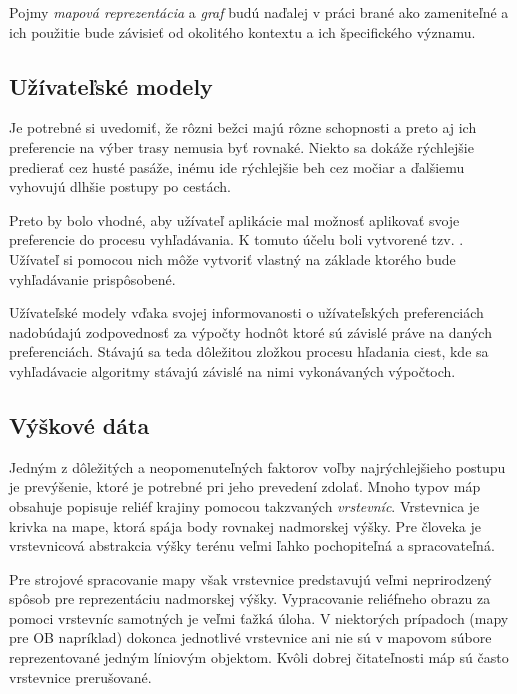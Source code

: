 Pojmy \textit{mapová reprezentácia} a \textit{graf} budú naďalej v práci brané ako zameniteľné a ich použitie bude závisieť od okolitého kontextu a ich špecifického významu.

\subsection{Užívateľské modely}

Je potrebné si uvedomiť, že rôzni bežci majú rôzne schopnosti a preto aj ich preferencie na výber trasy nemusia byť rovnaké. Niekto sa dokáže rýchlejšie predierať cez husté pasáže, inému ide rýchlejšie beh cez močiar a ďalšiemu vyhovujú dlhšie postupy po cestách. 

Preto by bolo vhodné, aby užívateľ aplikácie mal možnosť aplikovať svoje preferencie do procesu vyhľadávania. K tomuto účelu boli vytvorené tzv. . Užívateľ si pomocou nich môže vytvoriť vlastný  na základe ktorého bude vyhľadávanie prispôsobené.

Užívateľské modely vďaka svojej informovanosti o užívateľských preferenciách nadobúdajú zodpovednosť za výpočty hodnôt ktoré sú závislé práve na daných preferenciách. Stávajú sa teda dôležitou zložkou procesu hľadania ciest, kde sa vyhľadávacie algoritmy stávajú závislé na nimi vykonávaných výpočtoch.

\subsection{Výškové dáta}

Jedným z dôležitých a neopomenuteľných faktorov voľby najrýchlejšieho postupu je prevýšenie, ktoré je potrebné pri jeho prevedení zdolať. Mnoho typov máp obsahuje popisuje reliéf krajiny pomocou takzvaných \textit{vrstevníc}. Vrstevnica je krivka na mape, ktorá spája body rovnakej nadmorskej výšky. Pre človeka je vrstevnicová abstrakcia výšky terénu veľmi ľahko pochopiteľná a spracovateľná.

Pre strojové spracovanie mapy však vrstevnice predstavujú veľmi neprirodzený spôsob pre reprezentáciu nadmorskej výšky. Vypracovanie reliéfneho obrazu za pomoci vrstevníc samotných je veľmi ťažká úloha. V niektorých prípadoch (mapy pre OB napríklad) dokonca jednotlivé vrstevnice ani nie sú v mapovom súbore reprezentované jedným líniovým objektom. Kvôli dobrej čitateľnosti máp sú často vrstevnice prerušované.

